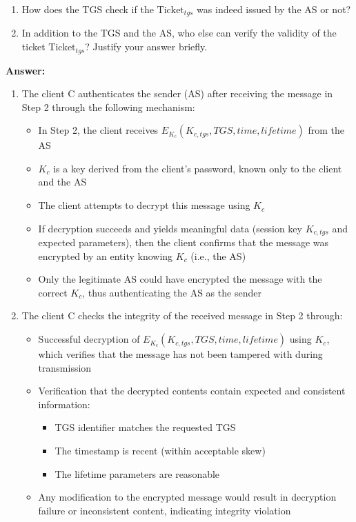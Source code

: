 \documentclass[11pt]{article}
\begin{document}
\begin{description}
\begin{enumerate}
\item How does the TGS check if the $\mbox{Ticket}_{tgs}$ was indeed issued by the AS or not?   \hfill {} 


\item In addition to the TGS and the AS, who else can verify the validity of the ticket $\mbox{Ticket}_{tgs}$? 
Justify your answer briefly.  \hfill {} 

\end{enumerate}  

\textbf{Answer:}
    \item 
    \begin{enumerate}
    \item The client C authenticates the sender (AS) after receiving the message in Step 2 through the following mechanism:
    \begin{itemize}
        \item In Step 2, the client receives $E_{K_c}(K_{c,tgs}, TGS, time, lifetime)$ from the AS
        \item $K_c$ is a key derived from the client's password, known only to the client and the AS
        \item The client attempts to decrypt this message using $K_c$
        \item If decryption succeeds and yields meaningful data (session key $K_{c,tgs}$ and expected parameters), then the client confirms that the message was encrypted by an entity knowing $K_c$ (i.e., the AS)
        \item Only the legitimate AS could have encrypted the message with the correct $K_c$, thus authenticating the AS as the sender
    \end{itemize}
    
    \item The client C checks the integrity of the received message in Step 2 through:
    \begin{itemize}
        \item Successful decryption of $E_{K_c}(K_{c,tgs}, TGS, time, lifetime)$ using $K_c$, which verifies that the message has not been tampered with during transmission
        \item Verification that the decrypted contents contain expected and consistent information:
            \begin{itemize}
                \item TGS identifier matches the requested TGS
                \item The timestamp is recent (within acceptable skew)
                \item The lifetime parameters are reasonable
            \end{itemize}
        \item Any modification to the encrypted message would result in decryption failure or inconsistent content, indicating integrity violation
    \end{itemize}
    

\end{enumerate}
\end{description}
\end{document}
